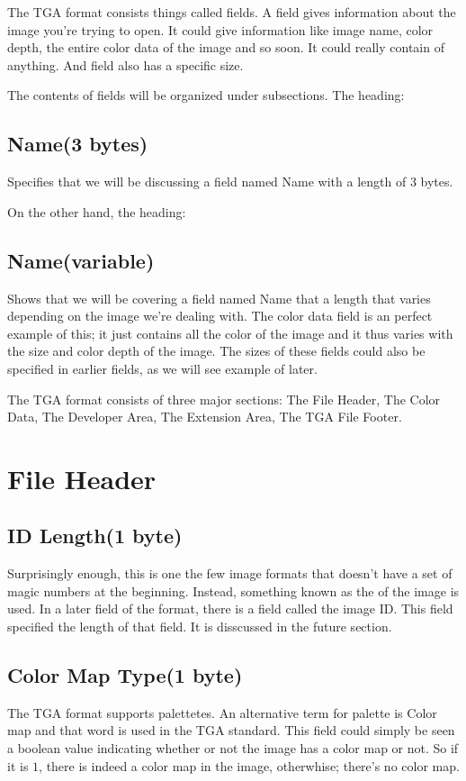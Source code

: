 \begin{refsection}
  The TGA format consists things called fields. A field
  gives information about the image you're trying to open. It could
  give information like image name, color depth, the entire color data
  of the image and so soon. It could really contain of anything. And
  field also has a specific size.

  \newcommand{\plural}[3]{\ifstrequal{#1}{1}{#2}{#3}}
  \newcommand{\fieldlength}[1]{\ifstrequal{#1}{0}{variable}{#1 \plural{#1}{byte}{bytes}}}
  \newcommand{\imgfield}[2]{\subsection*{#1(\fieldlength{#2})}}

  The contents of fields will be organized under subsections. The heading:

  \imgfield{Name}{3}

  Specifies that we will be discussing a field named Name with a length
  of 3 bytes.

  On the other hand, the heading:

  \imgfield{Name}{0}

  Shows that we will be covering a field named Name that a length
  that varies depending on the image we're dealing with. The color
  data field is an perfect example of this; it just contains all the
  color of the image and it thus varies with the size and color depth
  of the image. The sizes of these fields could also be specified in
  earlier fields, as we will see example of later.

  The TGA format consists of three major sections: The File Header,
  The Color Data, The Developer Area, The Extension Area, The TGA File
  Footer.

  \section{File Header}

  \imgfield{ID Length}{1}

  Surprisingly enough, this is one the few image formats that doesn't
  have a set of magic numbers at the beginning. Instead, something
  known as the of the image is used. In a later field of
  the format, there is a field called the image ID. This field
  specified the length of that field. It is disscussed
  in the future section.

  \imgfield{Color Map Type}{1}

  The TGA format supports palettetes. An alternative term for palette
  is Color map and that word is used in the TGA
  standard. This field could simply be seen a boolean value indicating
  whether or not the image has a color map or not. So if it is $1$,
  there is indeed a color map in the image, otherwhise; there's no
  color map.


\end{refsection}
